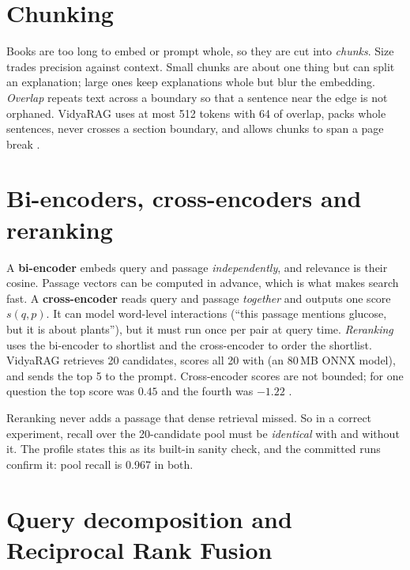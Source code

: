 \section{Chunking}

Books are too long to embed or prompt whole, so they are cut into \emph{chunks}. Size trades precision against context. Small chunks are about one thing but can split an explanation; large ones keep explanations whole but blur the embedding. \emph{Overlap} repeats text across a boundary so that a sentence near the edge is not orphaned. VidyaRAG uses at most 512 tokens with 64 of overlap, packs whole sentences, never crosses a section boundary, and allows chunks to span a page break .

\section{Bi-encoders, cross-encoders and reranking}
\label{sec:crossencoder}

A \textbf{bi-encoder} embeds query and passage \emph{independently}, and relevance is their cosine. Passage vectors can be computed in advance, which is what makes search fast. A \textbf{cross-encoder} reads query and passage \emph{together} and outputs one score $s(q,p)$. It can model word-level interactions (``this passage mentions glucose, but it is about plants''), but it must run once per pair at query time. \emph{Reranking} uses the bi-encoder to shortlist and the cross-encoder to order the shortlist. VidyaRAG retrieves 20 candidates, scores all 20 with  (an 80\,MB ONNX model), and sends the top 5 to the prompt. Cross-encoder scores are not bounded; for one question the top score was $0.45$ and the fourth was $-1.22$ \tagM.

\begin{keyidea}
Reranking never adds a passage that dense retrieval missed. So in a correct experiment, recall over the 20-candidate pool must be \emph{identical} with and without it. The  profile states this as its built-in sanity check, and the committed runs confirm it: pool recall is 0.967 in both.
\end{keyidea}

\section{Query decomposition and Reciprocal Rank Fusion}
\label{sec:rrf}

